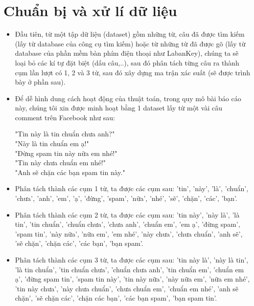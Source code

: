 \section{Chuẩn bị và xử lí dữ liệu}
\begin{itemize}
    \item Đầu tiên, từ một tập dữ liệu (dataset) gồm những từ, câu đã được tìm kiếm (lấy từ database của công cụ tìm kiếm) hoặc từ những từ đã được gõ (lấy từ database của phần mềm bàn phím điện thoại như LabanKey), chúng ta sẽ loại bỏ các kí tự đặt biệt (dấu câu,..), sau đó phân tách từng câu ra thành cụm lần lượt có 1, 2 và 3 từ, sau đó xây dựng ma trận xác suất (sẽ được trình bày ở phần sau). 
    \item Để dễ hình dung cách hoạt động của thuật toán, trong quy mô bài báo cáo này, chúng tôi xin được minh hoạt bằng 1 dataset lấy từ một vài câu comment trên Facebook như sau:

    \begin{center}
    "Tin này là tin chuẩn chưa anh?" \\
    "Này là tin chuẩn em ạ!" \\
    "Đừng spam tin này nữa em nhé!" \\
    "Tin này chưa chuẩn em nhé!" \\
    "Anh sẽ chặn các bạn spam tin này." 
    \end{center}

    \item Phân tách thành các cụm 1 từ, ta được các cụm sau: 
    'tin', 'này', 'là', 'chuẩn', 'chưa', 'anh', 'em', 'ạ', 'đừng', 'spam', 'nữa', 'nhé', 'sẽ', 'chặn', 'các', 'bạn'.
    \item Phân tách thành các cụm 2 từ, ta được các cụm sau: 'tin này', 'này là', 'là tin', 'tin chuẩn', 'chuẩn chưa', 'chưa anh', 'chuẩn em', 'em ạ', 'đừng spam', 'spam tin', 'này nữa', 'nữa em', 'em nhé', 'này chưa', 'chưa chuẩn', 'anh sẽ', 'sẽ chặn', 'chặn các', 'các bạn', 'bạn spam'.
    \item Phân tách thành các cụm 3 từ, ta được các cụm sau: 'tin này là', 'này là tin', 'là tin chuẩn', 'tin chuẩn chưa', 'chuẩn chưa anh', 'tin chuẩn em', 'chuẩn em ạ', 'đừng spam tin', 'spam tin này', 'tin này nữa', 'này nữa em', 'nữa em nhé', 'tin này chưa', 'này chưa chuẩn', 'chưa chuẩn em', 'chuẩn em nhé', 'anh sẽ chặn', 'sẽ chặn các', 'chặn các bạn', 'các bạn spam', 'bạn spam tin'.

\end{itemize}

